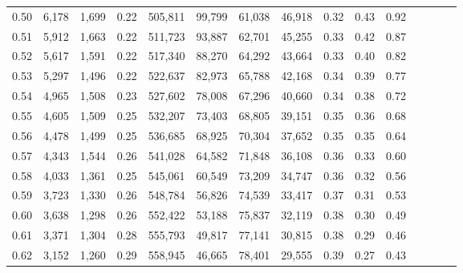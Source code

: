 \begin{tabular}{rrrcrrrrrrrrrrr}
0.50 &   6,178 &  1,699 &                                       0.22 &  505,811 &   99,799 &   61,038 &   46,918 &  0.32 &  0.43 &                         0.92 \\
0.51 &   5,912 &  1,663 &                                       0.22 &  511,723 &   93,887 &   62,701 &   45,255 &  0.33 &  0.42 &                         0.87 \\
0.52 &   5,617 &  1,591 &                                       0.22 &  517,340 &   88,270 &   64,292 &   43,664 &  0.33 &  0.40 &                         0.82 \\
0.53 &   5,297 &  1,496 &                                       0.22 &  522,637 &   82,973 &   65,788 &   42,168 &  0.34 &  0.39 &                         0.77 \\
0.54 &   4,965 &  1,508 &                                       0.23 &  527,602 &   78,008 &   67,296 &   40,660 &  0.34 &  0.38 &                         0.72 \\
0.55 &   4,605 &  1,509 &                                       0.25 &  532,207 &   73,403 &   68,805 &   39,151 &  0.35 &  0.36 &                         0.68 \\
0.56 &   4,478 &  1,499 &                                       0.25 &  536,685 &   68,925 &   70,304 &   37,652 &  0.35 &  0.35 &                         0.64 \\
0.57 &   4,343 &  1,544 &                                       0.26 &  541,028 &   64,582 &   71,848 &   36,108 &  0.36 &  0.33 &                         0.60 \\
0.58 &   4,033 &  1,361 &                                       0.25 &  545,061 &   60,549 &   73,209 &   34,747 &  0.36 &  0.32 &                         0.56 \\
0.59 &   3,723 &  1,330 &                                       0.26 &  548,784 &   56,826 &   74,539 &   33,417 &  0.37 &  0.31 &                         0.53 \\
0.60 &   3,638 &  1,298 &                                       0.26 &  552,422 &   53,188 &   75,837 &   32,119 &  0.38 &  0.30 &                         0.49 \\
0.61 &   3,371 &  1,304 &                                       0.28 &  555,793 &   49,817 &   77,141 &   30,815 &  0.38 &  0.29 &                         0.46 \\
0.62 &   3,152 &  1,260 &                                       0.29 &  558,945 &   46,665 &   78,401 &   29,555 &  0.39 &  0.27 &                         0.43 \\

\end{tabular}
